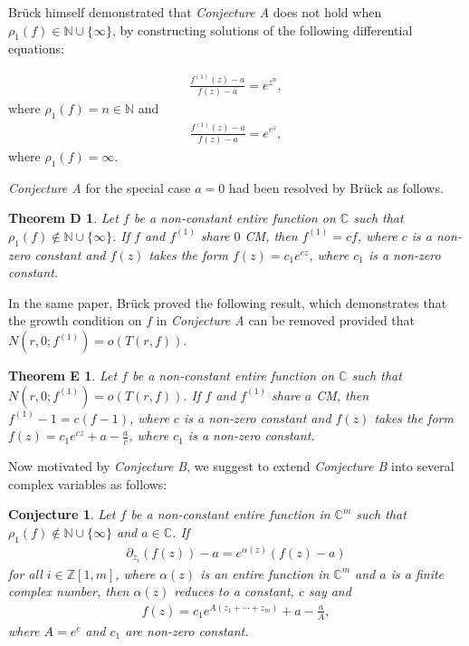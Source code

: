 \documentclass[11pt, reqno]{amsart}
\newtheorem*{theoD}{Theorem D}
\newtheorem*{theoE}{Theorem E}
\newtheorem{conj}{Conjecture}[section]
\numberwithin{equation}{section}
\begin{document}
Br\"{u}ck \cite{Bruck-1996} himself demonstrated that \emph{Conjecture A} does not hold when $\rho_1(f)\in\mathbb{N}\cup\{\infty\}$, by constructing solutions of the following differential equations:

\begin{align*}
 \frac{f^{(1)}(z)-a}{f(z)-a}=e^{z^{n}},
 \end{align*}
where $\rho_1(f)=n\in\mathbb{N}$ and   
\begin{align*}
\frac{f^{(1)}(z)-a}{f(z)-a}=e^{e^{z}},
\end{align*}
where $\rho_1(f)=\infty$.

\emph{Conjecture A} for the special case $a=0$ had been resolved by Br\"{u}ck \cite{Bruck-1996} as follows.

\begin{theoD}\cite{Bruck-1996} Let $f$ be a non-constant entire function on $\mathbb{C}$ such that $\rho_1(f)\not\in\mathbb{N}\cup\{\infty\}$. If $f$ and $f^{(1)}$ share $0$ CM, then $f^{(1)}=cf$, where $c$ is a non-zero constant and $f(z)$ takes the form $f(z)=c_1e^{cz}$, where $c_1$ is a non-zero constant.
\end{theoD}

In the same paper, Br\"{u}ck \cite{Bruck-1996} proved the following result, which demonstrates that the growth condition on $f$ in 
\emph{Conjecture A} can be removed provided that $N(r,0;f^{(1)})=o(T(r,f))$.
\begin{theoE}\cite{Bruck-1996} Let $f$ be a non-constant entire function on $\mathbb{C}$ such that $N(r,0;f^{(1)})=o(T(r,f))$. If $f$ and $f^{(1)}$ share $a$ CM, then $f^{(1)}-1=c(f-1)$, where $c$ is a non-zero constant and $f(z)$ takes the form
$f(z)=c_1e^{cz}+a-\frac{a}{c}$, where $c_1$ is a non-zero constant. 
\end{theoE}

Now motivated by \emph{Conjecture B}, we suggest to extend \emph{Conjecture B} into several complex variables as follows:

\begin{conj} Let $f$ be a non-constant entire function in $\mathbb{C}^m$ such that $\rho_1(f)\not\in\mathbb{N}\cup\{\infty\}$ and $a\in\mathbb{C}$. If 
\begin{align}\label{bb1}
\partial_{z_i}(f(z))-a=e^{\alpha(z)}(f(z)-a)
\end{align}
 for all $i\in\mathbb{Z}[1,m]$, where $\alpha(z)$ is an entire function in $\mathbb{C}^m$ and $a$ is a finite complex number, then $\alpha(z)$ reduces to a constant, $c$ say and
\begin{align*}
f(z)=c_1e^{A(z_1+ \cdots+z_m)}+a-\frac{a}{A},
\end{align*}
where $A=e^c$ and $c_1$ are non-zero constant.
\end{conj}
\end{document}
